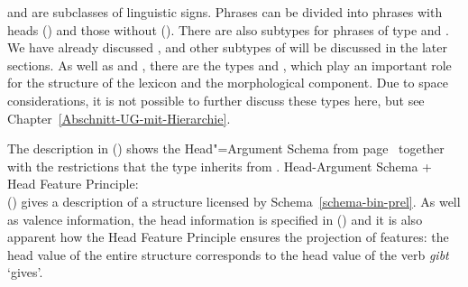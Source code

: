 \noindent
{} and  are subclasses of linguistic signs. Phrases can be divided into phrases with heads ()
and those without (). There are also subtypes for phrases of type  and .
We have already discussed , and other subtypes of  will be discussed in the later sections.
As well as  and , there are the types  and , which play an important role for the structure of the
lexicon and the morphological component. Due to space considerations, it is not possible to further discuss these types here,
but see Chapter~\ref{Abschnitt-UG-mit-Hierarchie}.

The description in () shows the Head"=Argument Schema from page~\pageref{schema-bin-prel} together with the restrictions that the type
 inherits from .
\eas
\label{head-arg-schema-hfp}
Head-Argument Schema + Head Feature Principle:\\
\zs
() gives a description of a structure licensed by Schema~\ref{schema-bin-prel}.
As well as valence information, the head information is specified in () and it is also apparent how the Head Feature Principle
ensures the projection of features: the head value of the entire structure  corresponds to
the head value of the verb \emph{gibt} `gives'.
\ea
